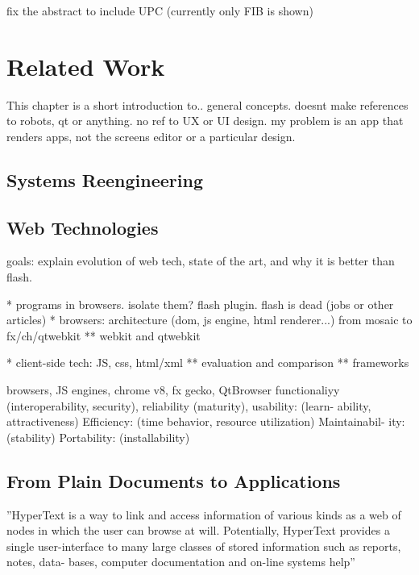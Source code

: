 
fix the abstract to include UPC (currently only FIB is shown)
\cite{Darwin} \cite{Crockford} \cite{Stefanov} \cite{AngularJSGuide} \cite{Fowler}


\chapter{Related Work}
This chapter is a short introduction to.. general concepts. doesnt make references to
robots, qt or anything. no ref to UX or UI design. my problem is an app that renders
apps, not the screens editor or a particular design.

\section{Systems Reengineering}

\section{Web Technologies}
goals: explain evolution of web tech, state of the art, and why it is better than flash.

* programs in browsers. isolate them? flash plugin. flash is dead (jobs or other
articles) 
* browsers: architecture (dom, js engine, html renderer...) from mosaic to
fx/ch/qtwebkit 
** webkit and qtwebkit

* client-side tech: JS, css, html/xml 
** evaluation and comparison 
** frameworks

browsers, JS engines, chrome v8, fx gecko, QtBrowser
 functionaliyy (interoperability, security), reliability (maturity), usability: (learn-
ability, attractiveness) Efficiency: (time behavior, resource utilization) Maintainabil-
ity: (stability) Portability: (installability)

\section{From Plain Documents to Applications}
”HyperText is a way to link and access information of various kinds as a web of
nodes in which the user can browse at will. Potentially, HyperText provides a single
user-interface to many large classes of stored information such as reports, notes, data-
bases, computer documentation and on-line systems help” \cite{BernersLee:1990}

